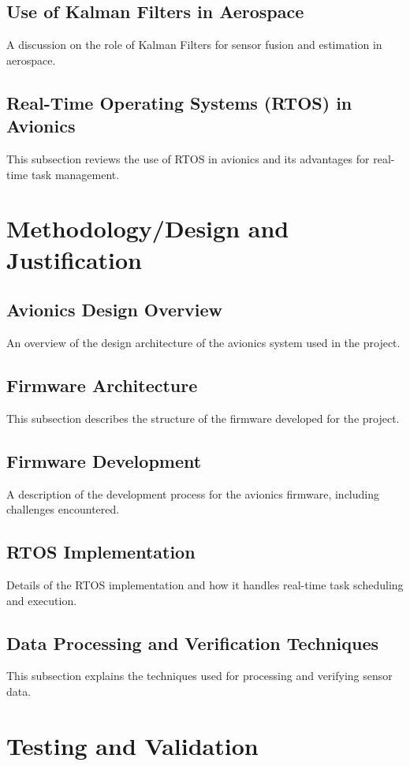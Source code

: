 \subsection{Use of Kalman Filters in Aerospace}
A discussion on the role of Kalman Filters for sensor fusion and estimation in aerospace.

\subsection{Real-Time Operating Systems (RTOS) in Avionics}
This subsection reviews the use of RTOS in avionics and its advantages for real-time task management.

\section{Methodology/Design and Justification}
\subsection{Avionics Design Overview}
An overview of the design architecture of the avionics system used in the project.

\subsection{Firmware Architecture}
This subsection describes the structure of the firmware developed for the project.

\subsection{Firmware Development}
A description of the development process for the avionics firmware, including challenges encountered.

\subsection{RTOS Implementation}
Details of the RTOS implementation and how it handles real-time task scheduling and execution.

\subsection{Data Processing and Verification Techniques}
This subsection explains the techniques used for processing and verifying sensor data.

\section{Testing and Validation}
